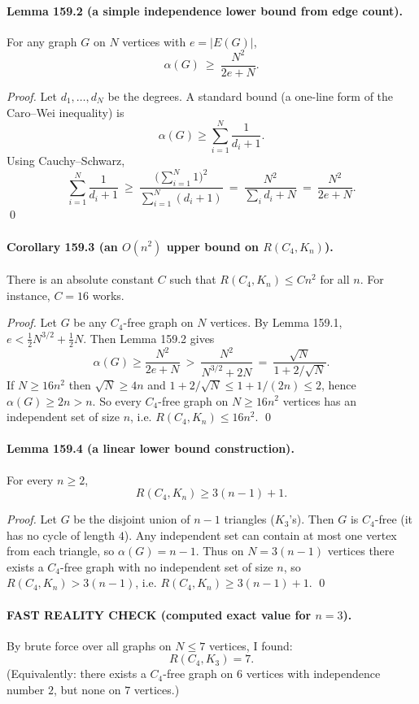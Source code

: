 \paragraph{Lemma 159.2 (a simple independence lower bound from edge count).}
For any graph $G$ on $N$ vertices with $e=|E(G)|$,
\[
\alpha(G)\ \ge\ \frac{N^2}{2e+N}.
\]

\textit{Proof.}
Let $d_1,\dots,d_N$ be the degrees. A standard bound (a one-line form of the Caro--Wei inequality) is
\[
\alpha(G)\ge \sum_{i=1}^N \frac{1}{d_i+1}.
\]
Using Cauchy--Schwarz,
\[
\sum_{i=1}^N \frac{1}{d_i+1}\ \ge\ \frac{\bigl(\sum_{i=1}^N 1\bigr)^2}{\sum_{i=1}^N (d_i+1)}
\ =\ \frac{N^2}{\sum_i d_i + N}\ =\ \frac{N^2}{2e+N}.
\]
\qed

\paragraph{Corollary 159.3 (an $O(n^2)$ upper bound on $R(C_4,K_n)$).}
There is an absolute constant $C$ such that $R(C_4,K_n)\le C n^2$ for all $n$.
For instance, $C=16$ works.

\textit{Proof.}
Let $G$ be any $C_4$-free graph on $N$ vertices. By Lemma 159.1, $e<\frac12 N^{3/2}+\frac12 N$.
Then Lemma 159.2 gives
\[
\alpha(G)\ge \frac{N^2}{2e+N}\ >\ \frac{N^2}{N^{3/2}+2N}\ =\ \frac{\sqrt N}{1+2/\sqrt N}.
\]
If $N\ge 16 n^2$ then $\sqrt N\ge 4n$ and $1+2/\sqrt N\le 1+1/(2n)\le 2$, hence $\alpha(G)\ge 2n>n$.
So every $C_4$-free graph on $N\ge 16n^2$ vertices has an independent set of size $n$, i.e. $R(C_4,K_n)\le 16n^2$. \qed

\paragraph{Lemma 159.4 (a linear lower bound construction).}
For every $n\ge 2$,
\[
R(C_4,K_n)\ge 3(n-1)+1.
\]

\textit{Proof.}
Let $G$ be the disjoint union of $n-1$ triangles ($K_3$'s). Then $G$ is $C_4$-free (it has no cycle of length $4$).
Any independent set can contain at most one vertex from each triangle, so $\alpha(G)=n-1$.
Thus on $N=3(n-1)$ vertices there exists a $C_4$-free graph with no independent set of size $n$, so $R(C_4,K_n)>3(n-1)$, i.e. $R(C_4,K_n)\ge 3(n-1)+1$. \qed

\paragraph{FAST REALITY CHECK (computed exact value for $n=3$).}
By brute force over all graphs on $N\le 7$ vertices, I found:
\[
R(C_4,K_3)=7.
\]
(Equivalently: there exists a $C_4$-free graph on $6$ vertices with independence number $2$, but none on $7$ vertices.)


